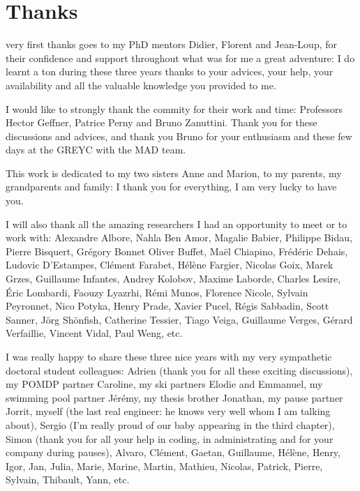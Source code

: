 \chapter*{Thanks}
\vspace{-2cm}
 very first thanks goes to my PhD mentors Didier, Florent and Jean-Loup,
for their confidence and support throughout what was for me a great adventure:
I do learnt a ton during these three years thanks to your advices, your help, 
your availability and all the valuable knowledge you provided to me.

I would like to strongly thank the commity for their work and time: 
Professors Hector Geffner, Patrice Perny and Bruno Zanuttini.
Thank you for these discussions and advices, 
and thank you Bruno for your enthusiasm 
and these few days at the GREYC with the MAD team.

This work is dedicated to my two sisters Anne and Marion, to my parents, my grandparents and family: 
I thank you for everything, I am very lucky to have you.

I will also thank all the amazing researchers 
I had an opportunity to meet or to work with:
Alexandre Albore,
Nahla Ben Amor,
Magalie Babier,
Philippe Bidau, 
Pierre Bisquert,
Gr\'egory Bonnet
Oliver Buffet,
Ma\"el Chiapino,
Fr\'ed\'eric Dehais,
Ludovic D'Estampes,
Cl\'ement Farabet,
H\'el\`ene Fargier, 
Nicolas Goix,
Marek Grzes, 
Guillaume Infantes,
Andrey Kolobov,
Maxime Laborde,
Charles Lesire,
\'Eric Lombardi,
Faouzy Lyazrhi,
R\'emi Munos,
Florence Nicole,
Sylvain Peyronnet,
Nico Potyka,
Henry Prade,
Xavier Pucel,
R\'egis Sabbadin, 
Scott Sanner,
J\"org Sh\"onfish,
Catherine Tessier,
Tiago Veiga,
Guillaume Verges,
G\'erard Verfaillie,
Vincent Vidal,
Paul Weng, etc.






I was really happy to share these three nice years with
my very sympathetic doctoral student colleagues: 
Adrien (thank you for all these exciting discussions), 
my POMDP partner Caroline,
my ski partners Elodie and Emmanuel,
my swimming pool partner J\'er\'emy, 
my thesis brother Jonathan, 
my pause partner Jorrit, 
myself (the last real engineer: he knows very well whom I am talking about), 
Sergio (I'm really proud of our baby appearing in the third chapter),  
Simon (thank you for all your help in coding, in administrating and for your company during pauses), 
Alvaro, Cl\'ement, Gaetan, Guillaume, H\'el\`ene, Henry, Igor, Jan, Julia, Marie, Marine, Martin, Mathieu, Nicolas, Patrick, Pierre, Sylvain, Thibault, Yann, etc.

